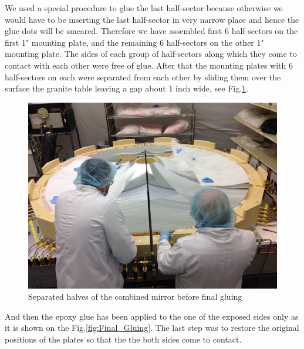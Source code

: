  We used a special procedure to glue the last half-sector because otherwise we would have to be inserting the last half-sector in very narrow place and hence the glue dots will be smeared. Therefore we have assembled first 6 half-sectors on the first 1" mounting plate, and the remaining 6 half-sectors on the other 1" mounting plate. The sides of each group of half-sectors along which they come to contact with each other were free of glue. After that the mounting plates with 6 half-sectors on each were separated from each other by sliding them over the surface the granite table leaving a gap about 1 inch wide, see Fig.\ref{fig:Separated_halves}.
 
  \begin{figure}[ht]
    \centering
    \includegraphics[width=1.0\linewidth]{images/Separated_halves.jpg}
    \caption{Separated halves of the combined mirror before final gluing}
    \label{fig:Separated_halves}
\end{figure}
 
 And then the epoxy glue has been applied to the one of the exposed sides only as it is shown on the Fig.\ref{fig:Final_Gluing}. The last step was to restore the original positions of the plates so that the the both sides come to contact.         
 
